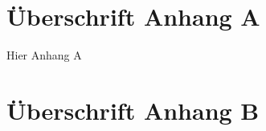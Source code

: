 \begin{appendix} 

\pagebreak

\section*{Überschrift Anhang A} 

Hier Anhang A

\clearpage

\section*{Überschrift Anhang B} 


\end{appendix} 

